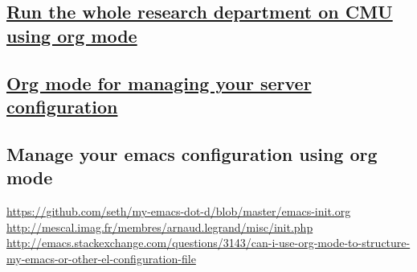 \documentclass[11pt]{article}
\begin{document}
\subsection{\href{http://kitchingroup.cheme.cmu.edu/blog/2014/08/08/What-we-are-using-org-mode-for/}{Run the whole research department on CMU using org mode}}
\label{sec:orgheadline57}
\subsection{\href{http://www.howardism.org/Technical/Emacs/literate-devops.html}{Org mode for managing your server configuration}}
\label{sec:orgheadline58}
\subsection{Manage your emacs configuration using org mode}
\label{sec:orgheadline59}
\url{https://github.com/seth/my-emacs-dot-d/blob/master/emacs-init.org}
\url{http://mescal.imag.fr/membres/arnaud.legrand/misc/init.php}
\url{http://emacs.stackexchange.com/questions/3143/can-i-use-org-mode-to-structure-my-emacs-or-other-el-configuration-file}
\end{document}
